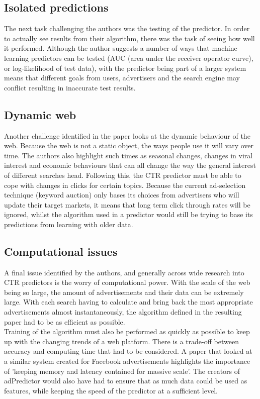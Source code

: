 \documentclass[journal]{IEEEtran}
\begin{document}
\subsection{Isolated predictions}
The next task challenging the authors was the testing of the predictor. In order to actually see results from their algorithm, there was the task of seeing how well it performed. Although the author suggests a number of ways that machine learning predictors can be tested (AUC (area under the receiver operator curve), or log-likelihood of test data), with the predictor being part of a larger system means that different goals from users, advertisers and the search engine may conflict resulting in inaccurate test results.

\subsection{Dynamic web}
Another challenge identified in the paper looks at the dynamic behaviour of the web. Because the web is not a static object, the ways people use it will vary over time. The authors also highlight such times as seasonal changes, changes in viral interest and economic behaviours that can all change the way the general interest of different searches head. Following this, the CTR predictor must be able to cope with changes in clicks for certain topics. Because the current ad-selection technique (keyword auction) only bases its choices from advertisers who will update their target markets, it means that long term click through rates will be ignored, whilst the algorithm used in a predictor would still be trying to base its predictions from learning with older data.

\subsection{Computational issues}
A final issue identified by the authors, and generally across wide research into CTR predictors is the worry of computational power. With the scale of the web being so large, the amount of advertisements and their data can be extremely large. With each search having to calculate and bring back the most appropriate advertisements almost instantaneously, the algorithm defined in the resulting paper had to be as efficient as possible. \\
Training of the algorithm must also be performed as quickly as possible to keep up with the changing trends of a web platform. There is a trade-off between accuracy and computing time that had to be considered. A paper that looked at a similar system created for Facebook advertisements \cite{facebook} highlights the importance of 'keeping memory and latency contained for massive scale'. The creators of adPredictor would also have had to ensure that as much data could be used as features, while keeping the speed of the predictor at a sufficient level.
\end{document}

